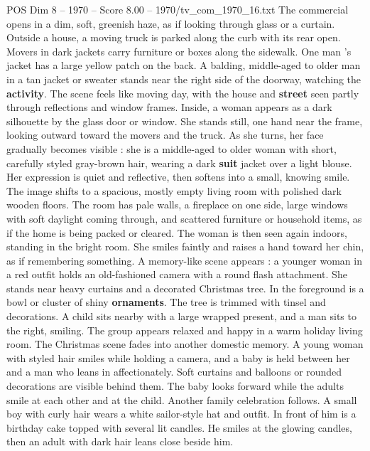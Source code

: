 \begin{textsample}{POS Dim 8 – 1970 – Score 8.00 – 1970/tv\_com\_1970\_16.txt}  \label{ex:f8_pos_032}
The commercial opens in a dim, soft, greenish haze, as if looking through glass or a curtain.
Outside a house, a moving truck is parked along the curb with its rear open.
Movers in dark jackets carry furniture or boxes along the sidewalk.
One man ’s jacket has a large yellow patch on the back.
A balding, middle-aged to older man in a tan jacket or sweater stands near the right side of the doorway, watching the \textbf{activity}.
The scene feels like moving day, with the house and \textbf{street} seen partly through reflections and window frames.
Inside, a woman appears as a dark silhouette by the glass door or window.
She stands still, one hand near the frame, looking outward toward the movers and the truck.
As she turns, her face gradually becomes visible : she is a middle-aged to older woman with short, carefully styled gray-brown hair, wearing a dark \textbf{suit} jacket over a light blouse.
Her expression is quiet and reflective, then softens into a small, knowing smile.
The image shifts to a spacious, mostly empty living room with polished dark wooden floors.
The room has pale walls, a fireplace on one side, large windows with soft daylight coming through, and scattered furniture or household items, as if the home is being packed or cleared.
The woman is then seen again indoors, standing in the bright room.
She smiles faintly and raises a hand toward her chin, as if remembering something.
A memory-like scene appears : a younger woman in a red outfit holds an old-fashioned camera with a round flash attachment.
She stands near heavy curtains and a decorated Christmas tree.
In the foreground is a bowl or cluster of shiny \textbf{ornaments}.
The tree is trimmed with tinsel and decorations.
A child sits nearby with a large wrapped present, and a man sits to the right, smiling.
The group appears relaxed and happy in a warm holiday living room.
The Christmas scene fades into another domestic memory.
A young woman with styled hair smiles while holding a camera, and a baby is held between her and a man who leans in affectionately.
Soft curtains and balloons or rounded decorations are visible behind them.
The baby looks forward while the adults smile at each other and at the child.
Another family celebration follows.
A small boy with curly hair wears a white sailor-style hat and outfit.
In front of him is a birthday cake topped with several lit candles.
He smiles at the glowing candles, then an adult with dark hair leans close beside him.

\end{textsample}
